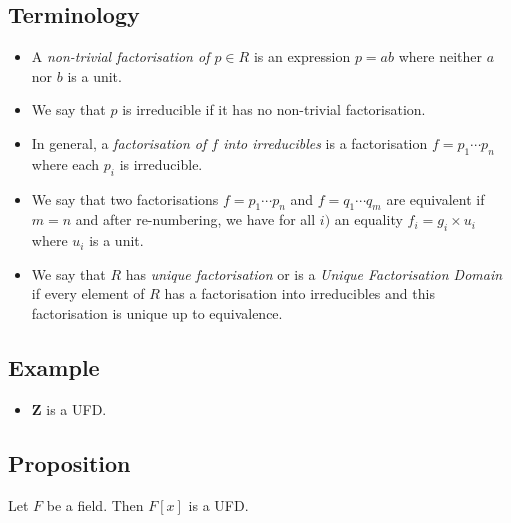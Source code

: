 \documentclass[11pt]{article}
\begin{document}
\subsection{Terminology}
\label{sec:orge4d4882}
\begin{itemize}
\item A \emph{non-trivial factorisation of \(p \in R\)} is an expression \(p = ab\) where neither \(a\) nor \(b\) is a unit.
\item We say that \(p\) is irreducible if it has no non-trivial factorisation.
\item In general, a \emph{factorisation of \(f\) into irreducibles} is a factorisation \(f = p_1 \cdots p_n\) where each \(p_{i}\) is irreducible.
\item We say that two factorisations \(f = p_1 \cdots p_{n}\) and \(f = q_1 \cdots q_{m}\) are equivalent if \(m = n\) and after re-numbering, we have for all \(i)\) an equality \(f_i = g_i \times u_i\) where \(u_i\) is a unit.
\item We say that \(R\) has \emph{unique factorisation} or is a \emph{Unique Factorisation Domain} if every element of \(R\) has a factorisation into irreducibles and this factorisation is unique up to equivalence.
\end{itemize}
\subsection{Example}
\label{sec:orgf9fe188}
\begin{itemize}
\item \(\mathbf{Z}\) is a UFD.
\end{itemize}
\subsection{Proposition}
\label{sec:org38a02f7}
Let \(F\) be a field.  Then \(F[x]\) is a UFD.
\end{document}
